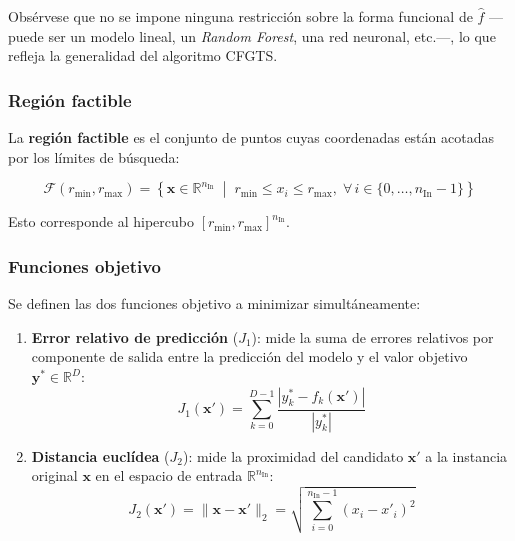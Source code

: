 \documentclass[12pt]{report} %
\begin{document}
Obsérvese que no se impone ninguna restricción sobre la forma funcional de $\hat{f}$ ---puede ser un modelo lineal, un \textit{Random Forest}, una red neuronal, etc.---, lo que refleja la generalidad del algoritmo CFGTS.

\subsubsection{Región factible}

La \textbf{región factible} es el conjunto de puntos cuyas coordenadas están acotadas por los límites de búsqueda:

\begin{equation}
    \mathcal{F}(r_{\min}, r_{\max}) = \left\{ \mathbf{x} \in \mathbb{R}^{n_{\text{In}}} \;\middle|\; r_{\min} \leq x_i \leq r_{\max},\; \forall\, i \in \{0, \ldots, n_{\text{In}}-1\} \right\}
    \label{eq:feasible_region}
\end{equation}

Esto corresponde al hipercubo $[r_{\min}, r_{\max}]^{n_{\text{In}}}$.

\subsubsection{Funciones objetivo}

Se definen las dos funciones objetivo a minimizar simultáneamente:

\begin{enumerate}
    \item \textbf{Error relativo de predicción} ($J_1$): mide la suma de errores relativos por componente de salida entre la predicción del modelo y el valor objetivo $\mathbf{y}^* \in \mathbb{R}^D$:
          \begin{equation}
              J_1(\mathbf{x}') = \sum_{k=0}^{D-1} \frac{|y^*_k - f_k(\mathbf{x}')|}{|y^*_k|}
              \label{eq:formal_j1}
          \end{equation}

    \item \textbf{Distancia euclídea} ($J_2$): mide la proximidad del candidato $\mathbf{x}'$ a la instancia original $\mathbf{x}$ en el espacio de entrada $\mathbb{R}^{n_{\text{In}}}$:
          \begin{equation}
              J_2(\mathbf{x}') = \|\mathbf{x} - \mathbf{x}'\|_2 = \sqrt{\sum_{i=0}^{n_{\text{In}}-1} (x_i - x'_i)^2}
              \label{eq:formal_j2}
          \end{equation}
\end{enumerate}
\end{document}
